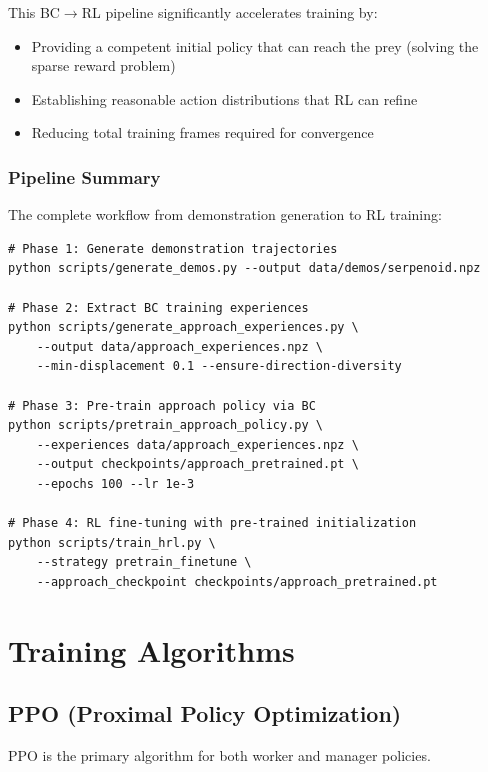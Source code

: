 \documentclass[11pt]{article}
\begin{document}
This BC$\rightarrow$RL pipeline significantly accelerates training by:
\begin{itemize}
    \item Providing a competent initial policy that can reach the prey (solving the sparse reward problem)
    \item Establishing reasonable action distributions that RL can refine
    \item Reducing total training frames required for convergence
\end{itemize}

\subsubsection{Pipeline Summary}

The complete workflow from demonstration generation to RL training:

\begin{listing}[H]
\begin{verbatim}
# Phase 1: Generate demonstration trajectories
python scripts/generate_demos.py --output data/demos/serpenoid.npz

# Phase 2: Extract BC training experiences
python scripts/generate_approach_experiences.py \
    --output data/approach_experiences.npz \
    --min-displacement 0.1 --ensure-direction-diversity

# Phase 3: Pre-train approach policy via BC
python scripts/pretrain_approach_policy.py \
    --experiences data/approach_experiences.npz \
    --output checkpoints/approach_pretrained.pt \
    --epochs 100 --lr 1e-3

# Phase 4: RL fine-tuning with pre-trained initialization
python scripts/train_hrl.py \
    --strategy pretrain_finetune \
    --approach_checkpoint checkpoints/approach_pretrained.pt
\end{verbatim}
\caption{Behavioral Cloning Pipeline Commands}
\end{listing}

\section{Training Algorithms}

\subsection{PPO (Proximal Policy Optimization)}

PPO is the primary algorithm for both worker and manager policies.
\end{document}
